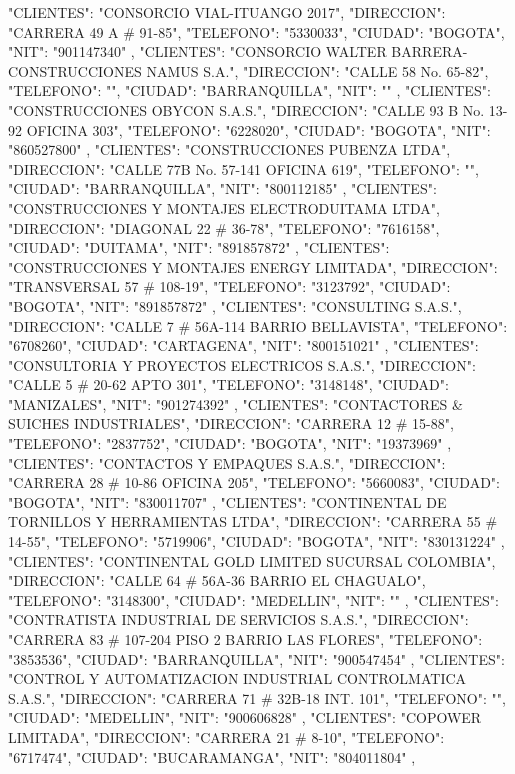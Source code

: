    {
   "CLIENTES": "CONSORCIO VIAL-ITUANGO 2017",
   "DIRECCION": "CARRERA 49 A # 91-85",
   "TELEFONO": "5330033",
   "CIUDAD": "BOGOTA",
   "NIT": "901147340"
   },
   {
   "CLIENTES": "CONSORCIO WALTER BARRERA-CONSTRUCCIONES NAMUS S.A.",
   "DIRECCION": "CALLE 58 No. 65-82",
   "TELEFONO": "",
   "CIUDAD": "BARRANQUILLA",
   "NIT": ""
   },
   {
   "CLIENTES": "CONSTRUCCIONES OBYCON S.A.S.",
   "DIRECCION": "CALLE 93 B No. 13-92 OFICINA 303",
   "TELEFONO": "6228020",
   "CIUDAD": "BOGOTA",
   "NIT": "860527800"
   },
   {
   "CLIENTES": "CONSTRUCCIONES PUBENZA LTDA",
   "DIRECCION": "CALLE 77B No. 57-141 OFICINA 619",
   "TELEFONO": "",
   "CIUDAD": "BARRANQUILLA",
   "NIT": "800112185"
   },
   {
   "CLIENTES": "CONSTRUCCIONES Y MONTAJES ELECTRODUITAMA LTDA",
   "DIRECCION": "DIAGONAL 22 # 36-78",
   "TELEFONO": "7616158",
   "CIUDAD": "DUITAMA",
   "NIT": "891857872"
   },
   {
   "CLIENTES": "CONSTRUCCIONES Y MONTAJES ENERGY LIMITADA",
   "DIRECCION": "TRANSVERSAL 57 # 108-19",
   "TELEFONO": "3123792",
   "CIUDAD": "BOGOTA",
   "NIT": "891857872"
   },
   {
   "CLIENTES": "CONSULTING S.A.S.",
   "DIRECCION": "CALLE 7 # 56A-114 BARRIO BELLAVISTA",
   "TELEFONO": "6708260",
   "CIUDAD": "CARTAGENA",
   "NIT": "800151021"
   },
   {
   "CLIENTES": "CONSULTORIA Y PROYECTOS ELECTRICOS S.A.S.",
   "DIRECCION": "CALLE 5 # 20-62 APTO 301",
   "TELEFONO": "3148148",
   "CIUDAD": "MANIZALES",
   "NIT": "901274392"
   },
   {
   "CLIENTES": "CONTACTORES & SUICHES INDUSTRIALES",
   "DIRECCION": "CARRERA 12 # 15-88",
   "TELEFONO": "2837752",
   "CIUDAD": "BOGOTA",
   "NIT": "19373969"
   },
   {
   "CLIENTES": "CONTACTOS Y EMPAQUES S.A.S.",
   "DIRECCION": "CARRERA 28 # 10-86 OFICINA 205",
   "TELEFONO": "5660083",
   "CIUDAD": "BOGOTA",
   "NIT": "830011707"
   },
   {
   "CLIENTES": "CONTINENTAL DE TORNILLOS Y HERRAMIENTAS LTDA",
   "DIRECCION": "CARRERA 55 # 14-55",
   "TELEFONO": "5719906",
   "CIUDAD": "BOGOTA",
   "NIT": "830131224"
   },
   {
   "CLIENTES": "CONTINENTAL GOLD LIMITED SUCURSAL COLOMBIA",
   "DIRECCION": "CALLE 64 # 56A-36 BARRIO EL CHAGUALO",
   "TELEFONO": "3148300",
   "CIUDAD": "MEDELLIN",
   "NIT": ""
   },
   {
   "CLIENTES": "CONTRATISTA INDUSTRIAL DE SERVICIOS S.A.S.",
   "DIRECCION": "CARRERA 83 # 107-204 PISO 2 BARRIO LAS FLORES",
   "TELEFONO": "3853536",
   "CIUDAD": "BARRANQUILLA",
   "NIT": "900547454"
   },
   {
   "CLIENTES": "CONTROL Y AUTOMATIZACION INDUSTRIAL CONTROLMATICA S.A.S.",
   "DIRECCION": "CARRERA 71 # 32B-18 INT. 101",
   "TELEFONO": "",
   "CIUDAD": "MEDELLIN",
   "NIT": "900606828"
   },
   {
   "CLIENTES": "COPOWER LIMITADA",
   "DIRECCION": "CARRERA 21 # 8-10",
   "TELEFONO": "6717474",
   "CIUDAD": "BUCARAMANGA",
   "NIT": "804011804"
   },

